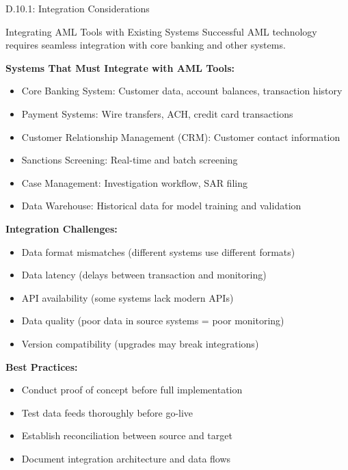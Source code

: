 \documentclass[11pt,a4paper]{beamer}
\begin{document}
\begin{frame}{D.10.1: Integration Considerations}
	\begin{block}{Integrating AML Tools with Existing Systems}
		Successful AML technology requires seamless integration with core banking and other systems.
	\end{block}
	\textbf{Systems That Must Integrate with AML Tools:}
	\begin{itemize}
		\item Core Banking System: Customer data, account balances, transaction history
		\item Payment Systems: Wire transfers, ACH, credit card transactions
		\item Customer Relationship Management (CRM): Customer contact information
		\item Sanctions Screening: Real-time and batch screening
		\item Case Management: Investigation workflow, SAR filing
		\item Data Warehouse: Historical data for model training and validation
	\end{itemize}
	\textbf{Integration Challenges:}
	\begin{itemize}
		\item Data format mismatches (different systems use different formats)
		\item Data latency (delays between transaction and monitoring)
		\item API availability (some systems lack modern APIs)
		\item Data quality (poor data in source systems = poor monitoring)
		\item Version compatibility (upgrades may break integrations)
	\end{itemize}
	\textbf{Best Practices:}
	\begin{itemize}
		\item Conduct proof of concept before full implementation
		\item Test data feeds thoroughly before go-live
		\item Establish reconciliation between source and target
		\item Document integration architecture and data flows
	\end{itemize}
\end{frame}
\end{document}
